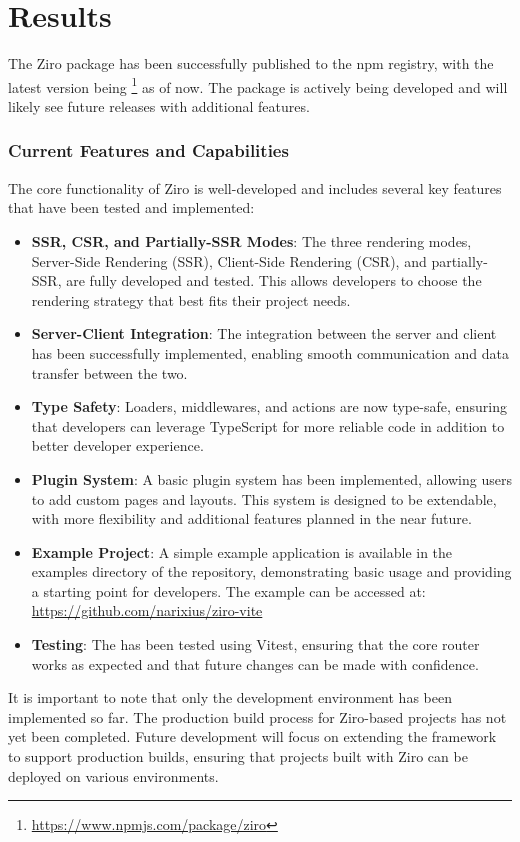 \section{Results}

The Ziro package has been successfully published to the npm registry, with the latest version being \footnote{\url{https://www.npmjs.com/package/ziro}} as of now. The package is actively being developed and will likely see future releases with additional features.

\subsubsection*{Current Features and Capabilities}

The core functionality of Ziro is well-developed and includes several key features that have been tested and implemented:

\begin{itemize}
	\item \textbf{SSR, CSR, and Partially-SSR Modes}: The three rendering modes, Server-Side Rendering (SSR), Client-Side Rendering (CSR), and partially-SSR, are fully developed and tested. This allows developers to choose the rendering strategy that best fits their project needs.
	\item \textbf{Server-Client Integration}: The integration between the server and client has been successfully implemented, enabling smooth communication and data transfer between the two.
	\item \textbf{Type Safety}: Loaders, middlewares, and actions are now type-safe, ensuring that developers can leverage TypeScript for more reliable code in addition to better developer experience.
	\item \textbf{Plugin System}: A basic plugin system has been implemented, allowing users to add custom pages and layouts. This system is designed to be extendable, with more flexibility and additional features planned in the near future.
	\item \textbf{Example Project}: A simple example application is available in the examples directory of the repository, demonstrating basic usage and providing a starting point for developers. The example can be accessed at: \url{https://github.com/narixius/ziro-vite}
	\item \textbf{Testing}: The  has been tested using Vitest, ensuring that the core router works as expected and that future changes can be made with confidence.

\end{itemize}

It is important to note that only the development environment has been implemented so far. The production build process for Ziro-based projects has not yet been completed. Future development will focus on extending the framework to support production builds, ensuring that projects built with Ziro can be deployed on various environments.



\pagebreak
